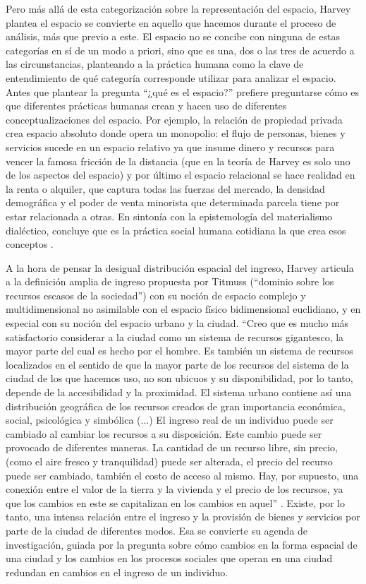 Pero más allá de esta categorización sobre la representación del espacio, Harvey plantea el espacio se convierte en aquello que hacemos durante el proceso de análisis, más que previo a este. El espacio no se concibe con ninguna de estas categorías en sí de un modo a priori, sino que es una, dos o las tres de acuerdo a las circunstancias, planteando a la práctica humana como la clave de entendimiento de qué categoría corresponde utilizar para analizar el espacio. Antes que plantear la pregunta “¿qué es el espacio?” prefiere preguntarse cómo es que diferentes prácticas humanas crean y hacen uso de diferentes conceptualizaciones del espacio. Por ejemplo, la relación de propiedad  privada crea espacio absoluto donde opera un monopolio: el flujo de personas, bienes y servicios sucede en un espacio relativo ya que insume dinero y recursos para vencer la famosa fricción de la distancia (que en la teoría de Harvey es solo uno de los aspectos del espacio) y por último el espacio relacional se hace realidad en la renta o alquiler, que captura todas las fuerzas del mercado, la densidad demográfica y el poder de venta minorista que determinada parcela tiene por estar relacionada a otras. En sintonía con la epistemología del materialismo dialéctico, concluye que es la práctica social humana cotidiana la que crea esos conceptos \cite[p.~13]{harvey}.

A la hora de pensar la desigual distribución espacial del ingreso, Harvey articula a la definición amplia de ingreso propuesta por Titmuss (“dominio sobre los recursos escasos de la sociedad”) con su noción de espacio complejo y multidimensional no asimilable con el espacio físico bidimensional euclidiano, y en especial con su noción del espacio urbano y la ciudad. “Creo que es mucho más satisfactorio considerar a la ciudad como un sistema de recursos gigantesco, la mayor parte del cual es hecho por el hombre. Es también un sistema de recursos localizados en el sentido de que la mayor parte de los recursos del sistema de la ciudad de los que hacemos uso, no son ubicuos y su disponibilidad, por lo tanto, depende de la accesibilidad y la proximidad. El sistema urbano contiene así una distribución geográfica de los recursos creados de gran importancia económica, social, psicológica y simbólica (...) El ingreso real de un individuo puede ser cambiado al cambiar los recursos a su disposición. Este cambio puede ser provocado de diferentes maneras. La cantidad de un recurso libre, sin precio, (como el aire fresco y tranquilidad) puede ser alterada, el precio del recurso puede ser cambiado, también el costo de acceso al mismo. Hay, por supuesto, una conexión entre el valor de la tierra y la vivienda y el precio de los recursos, ya que los cambios en este se capitalizan en los cambios en aquel” \cite[p.~68]{harvey}. Existe, por lo tanto, una intensa relación entre el ingreso y la provisión de bienes y servicios por parte de la ciudad de diferentes modos. Esa se convierte su agenda de investigación, guiada por la pregunta sobre cómo cambios en la forma espacial de una ciudad y los cambios en los procesos sociales que operan en una ciudad redundan en cambios en el ingreso de un individuo. 

